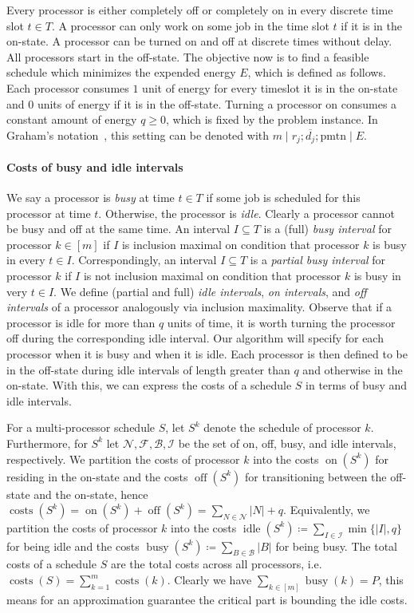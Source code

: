 \documentclass[a4paper]{article}
\DeclareMathOperator{\on}{on}
\DeclareMathOperator{\off}{off}
\DeclareMathOperator{\idle}{idle}
\DeclareMathOperator{\busy}{busy}
\DeclareMathOperator{\costs}{costs}
\begin{document}
Every processor is either completely off or completely on in every discrete time slot $t \in T$.
A processor can only work on some job in the time slot $t$ if it is in the on-state.
A processor can be turned on and off at discrete times without delay.
All processors start in the off-state.
The objective now is to find a feasible schedule which minimizes the expended energy $E$, which is defined as follows.
Each processor consumes $1$ unit of energy for every timeslot it is in the on-state and $0$ units of energy if it is in the off-state.
Turning a processor on consumes a constant amount of energy $q \geq 0$, which is fixed by the problem instance.
In Graham's notation~\citep{graham}, this setting can be denoted with $m \mid r_j; \overline{d_j}; \mathrm{pmtn} \mid E$.

\paragraph{Costs of busy and idle intervals}
We say a processor is \emph{busy} at time $t \in T$ if some job is scheduled for this processor at time $t$.
Otherwise, the processor is \emph{idle}.
Clearly a processor cannot be busy and off at the same time.
An interval $I \subseteq T$ is a (full) \emph{busy interval} for processor $k \in [m]$ if $I$ is inclusion maximal on condition that processor $k$ is busy in every $t \in I$.
Correspondingly, an interval $I \subseteq T$ is a \emph{partial busy interval} for processor $k$ if $I$ is not inclusion maximal on condition that processor $k$ is busy in very $t \in I$.
We define (partial and full) \emph{idle intervals}, \emph{on intervals}, and \emph{off intervals} of a processor analogously via inclusion maximality.
Observe that if a processor is idle for more than $q$ units of time, it is worth turning the processor off during the corresponding idle interval.
Our algorithm will specify for each processor when it is busy and when it is idle.
Each processor is then defined to be in the off-state during idle intervals of length greater than $q$ and otherwise in the on-state.
With this, we can express the costs of a schedule $S$ in terms of busy and idle intervals.

For a multi-processor schedule $S$, let $S^k$ denote the schedule of processor $k$.
Furthermore, for $S^k$ let $\mathcal{N}, \mathcal{F}, \mathcal{B}, \mathcal{I}$ be the set of on, off, busy, and idle intervals, respectively.
We partition the costs of processor $k$ into the costs $\on(S^k)$ for residing in the on-state and the costs $\off(S^k)$ for transitioning between the off-state and the on-state, hence $\costs(S^k) = \on(S^k) + \off(S^k) = \sum_{N \in \mathcal{N}} |N| + q$.
Equivalently, we partition the costs of processor $k$ into the costs $\idle(S^k) \coloneqq \sum_{I \in \mathcal{I}} \min \{ |I|, q \}$ for being idle and the costs $\busy(S^k) \coloneqq \sum_{B \in \mathcal{B}} |B|$ for being busy.
The total costs of a schedule $S$ are the total costs across all processors, i.e.\ $\costs(S) = \sum_{k = 1}^{m} \costs(k)$.
Clearly we have $\sum_{k \in [m]} \busy(k) = P$, this means for an approximation guarantee the critical part is bounding the idle costs.
\end{document}
